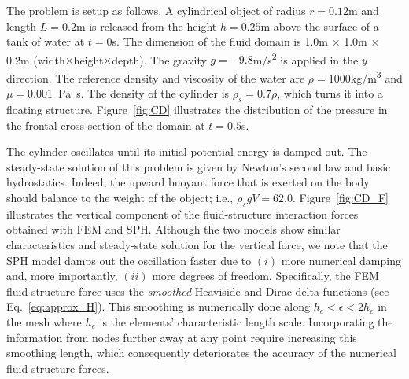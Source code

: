 The problem is setup as follows. A cylindrical object of radius $r=0.12$\si{m} and length $L=0.2$\si{m} is released from the height $h=0.25$\si{m} above the surface of a tank of water at $t=0$\si{s}. The dimension of the fluid domain is 1.0\si{m} $\times$ 1.0\si{m} $\times$ 0.2\si{m} (width$\times$height$\times$depth). The gravity $g=-9.8$\si{m/s^2} is applied in the $y$ direction. The reference density and viscosity of the water are $\rho=1000$\si{kg/m^3} and $\mu=$\SI{0.001}{Pa.s}. The density of the cylinder is $\rho_s=0.7\rho$, which turns it into a floating structure. Figure~\ref{fig:CD} illustrates the distribution of the pressure in the frontal cross-section of the domain at $t=0.5$\si{s}. 

The cylinder oscillates until its initial potential energy is damped out. The steady-state solution of this problem is given by Newton's second law and basic hydrostatics. Indeed, the upward buoyant force that is exerted on the body should balance to the weight of the object; i.e., $\rho_s g V =62.0$. Figure~\ref{fig:CD_F} illustrates the vertical component of the fluid-structure interaction forces obtained with FEM and SPH. Although the two models show similar characteristics and steady-state solution for the vertical force, we note that the SPH model damps out the oscillation faster due to $(i)$ more numerical damping and, more importantly, $(ii)$ more degrees of freedom. Specifically, the FEM fluid-structure force uses the \textit{smoothed} Heaviside and Dirac delta functions (see Eq.~\ref{eq:approx_H}). This smoothing is numerically done along $h_e<\epsilon<2h_e$ in the mesh where $h_e$ is the elements' characteristic length scale. Incorporating the information from nodes further away at any point require increasing this smoothing length, which consequently deteriorates the accuracy of the numerical fluid-structure forces.
